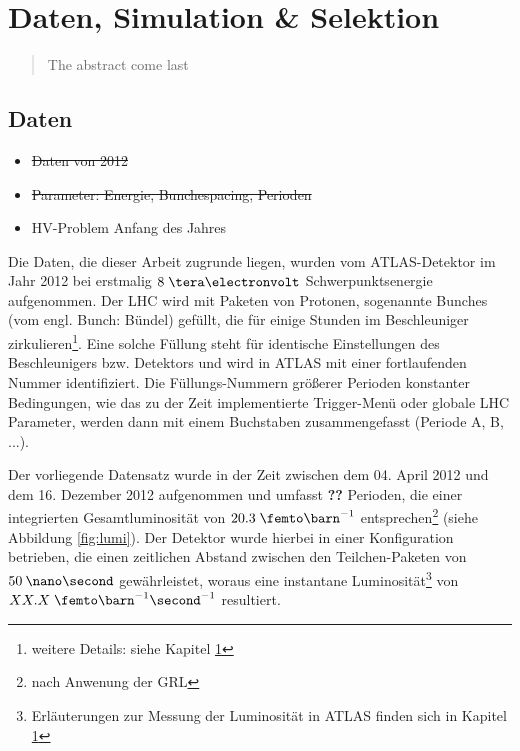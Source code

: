 


\chapter{Daten, Simulation \& Selektion}

\begin{quote}
    The abstract come last
\end{quote}



\section{Daten}
\label{data_sim_selection:data}

\begin{itemize}
    \item \sout{Daten von 2012}
    \item \sout{Parameter: Energie, Bunchespacing, Perioden}
    \item HV-Problem Anfang des Jahres
\end{itemize}

Die Daten, die dieser Arbeit zugrunde liegen, wurden vom ATLAS-Detektor im Jahr
2012 bei erstmalig $8 \TeV$ Schwerpunktsenergie aufgenommen. Der \ac{LHC} wird
mit Paketen von Protonen, sogenannte Bunches (vom engl. Bunch: Bündel) gefüllt,
die für einige Stunden im Beschleuniger zirkulieren\footnote{weitere Details:
siehe Kapitel \ref{}}.
Eine solche Füllung steht für identische Einstellungen des Beschleunigers bzw.
Detektors und wird in ATLAS mit einer fortlaufenden Nummer identifiziert.
Die Füllungs-Nummern größerer Perioden konstanter Bedingungen, wie das zu der
Zeit implementierte Trigger-Menü oder globale \ac{LHC} Parameter, werden dann
mit einem Buchstaben zusammengefasst (Periode A, B, ...).

Der vorliegende Datensatz wurde in der Zeit zwischen dem 04. April 2012 und dem
16. Dezember 2012 aufgenommen und umfasst \textbf{??} Perioden, die einer
integrierten Gesamtluminosität von $20.3 \fb^{-1}$ entsprechen\footnote{nach
Anwenung der \ac{GRL}} (siehe Abbildung \ref{fig:lumi}). Der Detektor wurde
hierbei in einer Konfiguration betrieben, die einen zeitlichen Abstand zwischen
den Teilchen-Paketen von $50\:\nano\second$ gewährleistet, woraus eine
instantane Luminosität\footnote{Erläuterungen zur Messung der Luminosität in
ATLAS finden sich in Kapitel \ref{}}
von $XX.X \fb^{-1}\second^{-1}$ resultiert.

